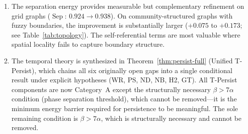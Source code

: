 \documentclass[lettersize,journal]{IEEEtran}
\DeclareMathOperator{\Sep}{Sep}
\begin{document}
\begin{enumerate}
\item The separation energy provides measurable but complementary refinement on grid graphs ($\Sep$: $0.924 \to 0.938$). On community-structured graphs with fuzzy boundaries, the improvement is substantially larger ($+0.075$ to $+0.173$; see Table~\ref{tab:topology}). The self-referential terms are most valuable where spatial locality fails to capture boundary structure.

\item The temporal theory is synthesized in Theorem~\ref{thm:persist-full} (Unified T-Persist), which chains all six originally open gaps into a single conditional result under explicit hypotheses (WR, PS, ND, NB, H2, GT). All T-Persist components are now Category~A except the structurally necessary $\beta > 7\alpha$ condition (phase separation threshold), which cannot be removed---it is the minimum energy barrier required for persistence to be meaningful. The sole remaining condition is $\beta > 7\alpha$, which is structurally necessary and cannot be removed.


\end{enumerate}
\end{document}

